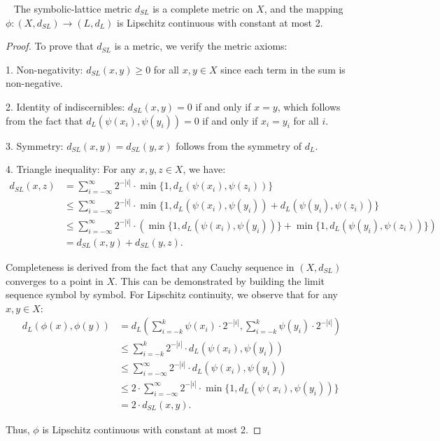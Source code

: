 \documentclass[10pt,a4paper]{amsart}
\begin{document}
\begin{proposition}~\label{propositionn1}
The symbolic-lattice metric $d_{SL}$ is a complete metric on $X$, and the mapping $\phi: (X, d_{SL}) \rightarrow (L, d_L)$ is Lipschitz continuous with constant at most 2.
\end{proposition}

\begin{proof}
To prove that $d_{SL}$ is a metric, we verify the metric axioms:

1. Non-negativity: $d_{SL}(x, y) \geq 0$ for all $x, y \in X$ since each term in the sum is non-negative.

2. Identity of indiscernibles: $d_{SL}(x, y) = 0$ if and only if $x = y$, which follows from the fact that $d_L(\psi(x_i), \psi(y_i)) = 0$ if and only if $x_i = y_i$ for all $i$.

3. Symmetry: $d_{SL}(x, y) = d_{SL}(y, x)$ follows from the symmetry of $d_L$.

4. Triangle inequality: For any $x, y, z \in X$, we have:
\begin{align*}
d_{SL}(x, z) &= \sum_{i=-\infty}^{\infty} 2^{-|i|} \cdot \min\{1, d_L(\psi(x_i), \psi(z_i))\} \\
&\leq \sum_{i=-\infty}^{\infty} 2^{-|i|} \cdot \min\{1, d_L(\psi(x_i), \psi(y_i)) + d_L(\psi(y_i), \psi(z_i))\} \\
&\leq \sum_{i=-\infty}^{\infty} 2^{-|i|} \cdot (\min\{1, d_L(\psi(x_i), \psi(y_i))\} + \min\{1, d_L(\psi(y_i), \psi(z_i))\}) \\
&= d_{SL}(x, y) + d_{SL}(y, z).
\end{align*}

Completeness is derived from the fact that any Cauchy sequence in $(X, d_{SL})$ converges to a point in $X$. This can be demonstrated by building the limit sequence symbol by symbol. For Lipschitz continuity, we observe that for any $x, y \in X$:
\begin{align*}
d_L(\phi(x), \phi(y)) &= d_L\left(\sum_{i=-k}^{k} \psi(x_i) \cdot 2^{-|i|}, \sum_{i=-k}^{k} \psi(y_i) \cdot 2^{-|i|}\right) \\
&\leq \sum_{i=-k}^{k} 2^{-|i|} \cdot d_L(\psi(x_i), \psi(y_i)) \\
&\leq \sum_{i=-\infty}^{\infty} 2^{-|i|} \cdot d_L(\psi(x_i), \psi(y_i)) \\
&\leq 2 \cdot \sum_{i=-\infty}^{\infty} 2^{-|i|} \cdot \min\{1, d_L(\psi(x_i), \psi(y_i))\} \\
&= 2 \cdot d_{SL}(x, y).
\end{align*}

Thus, $\phi$ is Lipschitz continuous with constant at most 2.
\end{proof}
\end{document}
